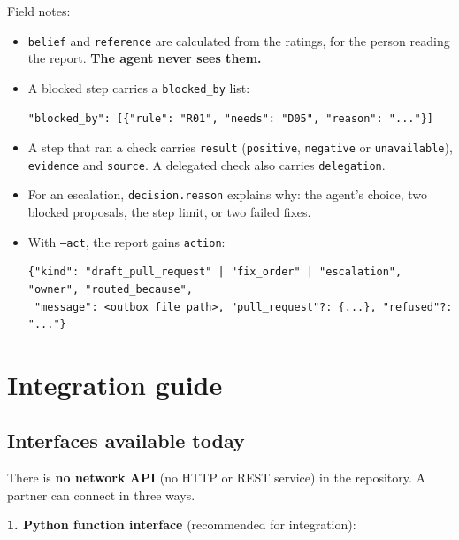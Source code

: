 \documentclass[11pt,a4paper]{article}
\newenvironment{codeblock}{\par\footnotesize}{\par}
\begin{document}
Field notes:
\begin{itemize}
\item \texttt{belief} and \texttt{reference} are calculated from the ratings, for the person
  reading the report. \textbf{The agent never sees them.}
\item A blocked step carries a \texttt{blocked\_by} list:
\begin{codeblock}
\begin{verbatim}
"blocked_by": [{"rule": "R01", "needs": "D05", "reason": "..."}]
\end{verbatim}
\end{codeblock}
\item A step that ran a check carries \texttt{result} (\texttt{positive}, \texttt{negative} or
  \texttt{unavailable}), \texttt{evidence} and \texttt{source}. A delegated check also carries
  \texttt{delegation}.
\item For an escalation, \texttt{decision.reason} explains why: the agent's choice, two blocked
  proposals, the step limit, or two failed fixes.
\item With \texttt{--act}, the report gains \texttt{action}:
\begin{codeblock}
\begin{verbatim}
{"kind": "draft_pull_request" | "fix_order" | "escalation", "owner", "routed_because",
 "message": <outbox file path>, "pull_request"?: {...}, "refused"?: "..."}
\end{verbatim}
\end{codeblock}
\end{itemize}

\section{Integration guide}

\subsection{Interfaces available today}

There is \textbf{no network API} (no HTTP or REST service) in the repository. A partner can
connect in three ways.

\textbf{1. Python function interface} (recommended for integration):
\end{document}
